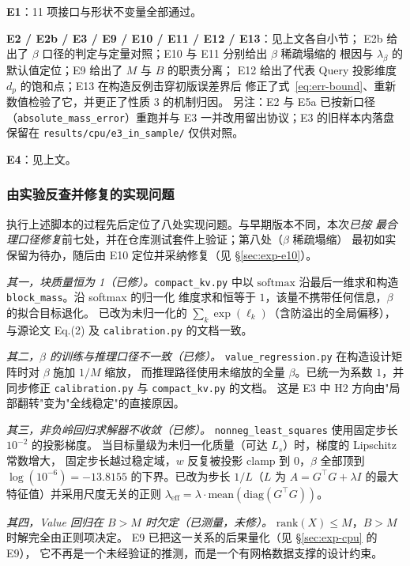 \textbf{E1}：11 项接口与形状不变量全部通过。

\textbf{E2 / E2b / E3 / E9 / E10 / E11 / E12 / E13}：见上文各自小节；
E2b 给出了 $\beta$ 口径的判定与定量对照；E10 与 E11 分别给出 $\beta$ 稀疏塌缩的
根因与 $\lambda_\beta$ 的默认值定位；E9 给出了 $M$ 与 $B$ 的职责分离；
E12 给出了代表 Query 投影维度 $d_p$ 的饱和点；E13 在构造反例击穿初版误差界后
修正了式~\eqref{eq:err-bound}、重新数值检验了它，并更正了性质 3 的机制归因。
另注：E2 与 E5a 已按新口径（\texttt{absolute\_mass\_error}）重跑并与
E3 一并改用留出协议；E3 的旧样本内落盘保留在
\texttt{results/cpu/e3\_in\_sample/} 仅供对照。

\textbf{E4}：见上文。

\subsubsection{由实验反查并修复的实现问题}

执行上述脚本的过程先后定位了八处实现问题。与早期版本不同，本次\emph{已按
最合理口径修复}前七处，并在仓库测试套件上验证；第八处（$\beta$ 稀疏塌缩）
最初如实保留为待办，随后由 E10 定位并采纳修复（见 \S\ref{sec:exp-e10}）。

\emph{其一，块质量恒为 1（已修）。}\texttt{compact\_kv.py} 中以
$\mathrm{softmax}$ 沿最后一维求和构造 \texttt{block\_mass}。沿 softmax 的归一化
维度求和恒等于 $1$，该量不携带任何信息，$\beta$ 的拟合目标退化。
已改为未归一化的 $\sum_k \exp(\ell_k)$（含防溢出的全局偏移），
与源论文 Eq.(2) 及 \texttt{calibration.py} 的文档一致。

{\sloppy
\emph{其二，$\beta$ 的训练与推理口径不一致（已修）。}
\texttt{value\_}\allowbreak\texttt{regression.py} 在构造设计矩阵时对 $\beta$ 施加 $1/M$ 缩放，
而推理路径使用未缩放的全量 $\beta$。已统一为系数 $1$，并同步修正
\texttt{calibration.py} 与 \texttt{compact\_kv.py} 的文档。
这是 E3 中 H2 方向由"局部翻转"变为"全线稳定"的直接原因。
\par}

\emph{其三，非负岭回归求解器不收敛（已修）。}
\texttt{nonneg\_}\allowbreak\texttt{least\_}\allowbreak\texttt{squares} 使用固定步长 $10^{-2}$ 的投影梯度。
当目标量级为未归一化质量（可达 $L_s$）时，梯度的 Lipschitz 常数增大，
固定步长越过稳定域，$w$ 反复被投影 clamp 到 $0$，$\beta$ 全部顶到
$\log(10^{-6})=-13.8155$ 的下界。已改为步长 $1/L$（$L$ 为
$A=G^{\top}G+\lambda I$ 的最大特征值）并采用尺度无关的正则
$\lambda_{\text{eff}}=\lambda\cdot\mathrm{mean}(\mathrm{diag}(G^{\top}G))$。

\emph{其四，Value 回归在 $B>M$ 时欠定（已测量，未修）。}
$\mathrm{rank}(X)\le M$，$B>M$ 时解完全由正则项决定。
E9 已把这一关系的后果量化（见 \S\ref{sec:exp-cpu} 的 E9），
它不再是一个未经验证的推测，而是一个有网格数据支撑的设计约束。

